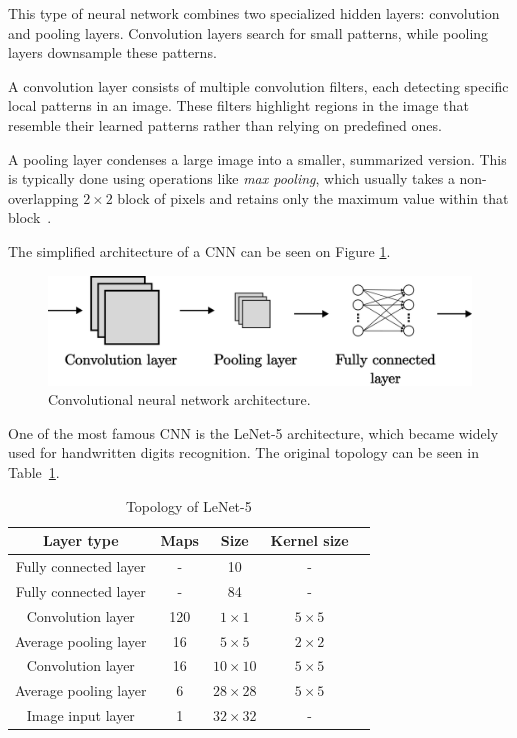 \documentclass[a4paper,oneside,onecolumn,12pt]{book}
\begin{document}
		This type of neural network combines two specialized hidden layers: convolution and pooling layers. Convolution layers search for small patterns, while pooling layers downsample these patterns.

		A convolution layer consists of multiple convolution filters, each detecting specific local patterns in an image. These filters highlight regions in the image that resemble their learned patterns rather than relying on predefined ones.

		A pooling layer condenses a large image into a smaller, summarized version. This is typically done using operations like \textit{max pooling}, which usually takes a non-overlapping $2 \times 2$ block of pixels and retains only the maximum value within that block~\cite{AISL}.

		The simplified architecture of a CNN can be seen on Figure \ref{fig:cnn}.
		\begin{figure}[H]
		\begin{center}
			\includegraphics[keepaspectratio,width=14cm]{kep/cnn.png}
			\caption{Convolutional neural network architecture.}
			\label{fig:cnn}
		\end{center}
		\end{figure}
		
		One of the most famous CNN is the LeNet-5 architecture, which became widely used for handwritten digits recognition. The original topology can be seen in Table~\ref{table:lenet_topology}.
		\begin{table}[H]
		\begin{center}
		\begin{tabular}{|c|c|c|c|c|}
		\hline
		\textbf{Layer type} & \textbf{Maps} & \textbf{Size} & \textbf{Kernel size} \\
		\hline
		Fully connected layer & - & 10 & - \\ 
		\hline
		Fully connected layer & - & 84 & - \\ 
		\hline
		Convolution layer & 120 & $1 \times 1$ & $5 \times 5$ \\ 
		\hline
		Average pooling layer & 16 & $5 \times 5$ & $2 \times 2$ \\
		\hline
		Convolution layer & 16 & $10 \times 10$ & $5 \times 5$ \\
		\hline
		Average pooling layer & 6 & $28 \times 28$ & $5 \times 5$ \\
		\hline
		Image input layer & 1 & $32 \times 32$ & - \\
		\hline
		\end{tabular}
		\end{center}
		\caption{Topology of LeNet-5}
		\label{table:lenet_topology}
		\end{table}
		
\end{document}
